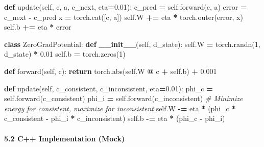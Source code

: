 \documentclass[
  11pt,
  a4paper,
]{article}
\newenvironment{Shaded}{\begin{snugshade}}{\end{snugshade}}
\newcommand{\BuiltInTok}[1]{#1}
\newcommand{\CommentTok}[1]{\textcolor[rgb]{0.56,0.35,0.01}{\textit{#1}}}
\newcommand{\ControlFlowTok}[1]{\textcolor[rgb]{0.13,0.29,0.53}{\textbf{#1}}}
\newcommand{\DecValTok}[1]{\textcolor[rgb]{0.00,0.00,0.81}{#1}}
\newcommand{\FloatTok}[1]{\textcolor[rgb]{0.00,0.00,0.81}{#1}}
\newcommand{\FunctionTok}[1]{\textcolor[rgb]{0.13,0.29,0.53}{\textbf{#1}}}
\newcommand{\KeywordTok}[1]{\textcolor[rgb]{0.13,0.29,0.53}{\textbf{#1}}}
\newcommand{\NormalTok}[1]{#1}
\newcommand{\OperatorTok}[1]{\textcolor[rgb]{0.81,0.36,0.00}{\textbf{#1}}}
\newcommand{\VariableTok}[1]{\textcolor[rgb]{0.00,0.00,0.00}{#1}}
\begin{document}
\begin{Shaded}
\begin{Highlighting}[]
    \KeywordTok{def}\NormalTok{ update(}\VariableTok{self}\NormalTok{, c, a, c\_next, eta}\OperatorTok{=}\FloatTok{0.01}\NormalTok{):}
\NormalTok{        c\_pred }\OperatorTok{=} \VariableTok{self}\NormalTok{.forward(c, a)}
\NormalTok{        error }\OperatorTok{=}\NormalTok{ c\_next }\OperatorTok{{-}}\NormalTok{ c\_pred}
\NormalTok{        x }\OperatorTok{=}\NormalTok{ torch.cat([c, a])}
        \VariableTok{self}\NormalTok{.W }\OperatorTok{+=}\NormalTok{ eta }\OperatorTok{*}\NormalTok{ torch.outer(error, x)}
        \VariableTok{self}\NormalTok{.b }\OperatorTok{+=}\NormalTok{ eta }\OperatorTok{*}\NormalTok{ error}

\KeywordTok{class}\NormalTok{ ZeroGradPotential:}
    \KeywordTok{def} \FunctionTok{\_\_init\_\_}\NormalTok{(}\VariableTok{self}\NormalTok{, d\_state):}
        \VariableTok{self}\NormalTok{.W }\OperatorTok{=}\NormalTok{ torch.randn(}\DecValTok{1}\NormalTok{, d\_state) }\OperatorTok{*} \FloatTok{0.01}
        \VariableTok{self}\NormalTok{.b }\OperatorTok{=}\NormalTok{ torch.zeros(}\DecValTok{1}\NormalTok{)}
    
    \KeywordTok{def}\NormalTok{ forward(}\VariableTok{self}\NormalTok{, c):}
        \ControlFlowTok{return}\NormalTok{ torch.}\BuiltInTok{abs}\NormalTok{(}\VariableTok{self}\NormalTok{.W }\OperatorTok{@}\NormalTok{ c }\OperatorTok{+} \VariableTok{self}\NormalTok{.b) }\OperatorTok{+} \FloatTok{0.001}
    
    \KeywordTok{def}\NormalTok{ update(}\VariableTok{self}\NormalTok{, c\_consistent, c\_inconsistent, eta}\OperatorTok{=}\FloatTok{0.01}\NormalTok{):}
\NormalTok{        phi\_c }\OperatorTok{=} \VariableTok{self}\NormalTok{.forward(c\_consistent)}
\NormalTok{        phi\_i }\OperatorTok{=} \VariableTok{self}\NormalTok{.forward(c\_inconsistent)}
        \CommentTok{\# Minimize energy for consistent, maximize for inconsistent}
        \VariableTok{self}\NormalTok{.W }\OperatorTok{{-}=}\NormalTok{ eta }\OperatorTok{*}\NormalTok{ (phi\_c }\OperatorTok{*}\NormalTok{ c\_consistent }\OperatorTok{{-}}\NormalTok{ phi\_i }\OperatorTok{*}\NormalTok{ c\_inconsistent)}
        \VariableTok{self}\NormalTok{.b }\OperatorTok{{-}=}\NormalTok{ eta }\OperatorTok{*}\NormalTok{ (phi\_c }\OperatorTok{{-}}\NormalTok{ phi\_i)}
\end{Highlighting}
\end{Shaded}

\paragraph{5.2 C++ Implementation (Mock)}\label{c-implementation-mock}
\end{document}
